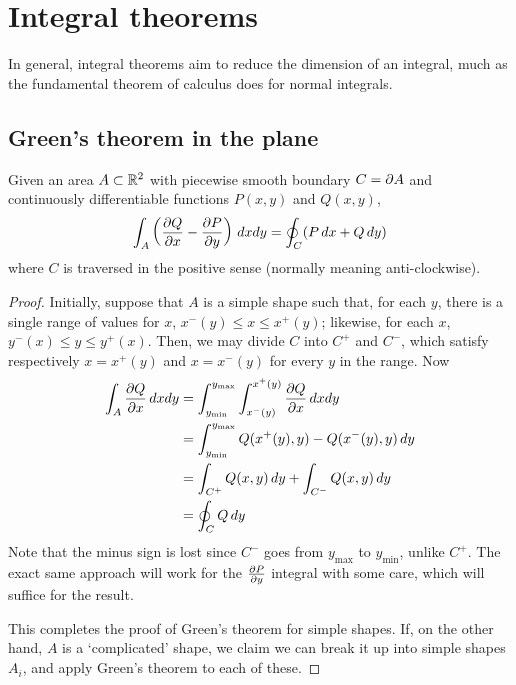 \documentclass{../template/note}
\begin{document}
    \section{Integral theorems}

    In general, integral theorems aim to reduce the dimension of an integral, much as the fundamental theorem of calculus does for normal integrals.

    \subsection{Green's theorem in the plane}

    \begin{theorem}
        \label{6.1}
        Given an area \(A \subset \mathbb R^2\) with piecewise smooth boundary \(C = \partial A\) and continuously differentiable functions \(P(x, y)\) and \(Q(x, y)\),
        \begin{align*}
            \int_A \left(\pd Q x - \pd P y \right) \D x dy = \oint_C (P \D x + Q \, dy)
        \end{align*}
        where \(C\) is traversed in the positive sense (normally meaning anti-clockwise).
    \end{theorem}
    
    \begin{proof}
        Initially, suppose that \(A\) is a simple shape such that, for each \(y\), there is a single range of values for \(x\), \(x^-(y) \leq x \leq x^+(y)\); likewise, for each \(x\), \(y^-(x) \leq y \leq y^+(x)\). Then, we may divide \(C\) into \(C^+\) and \(C^-\), which satisfy respectively \(x = x^+(y)\) and \(x = x^-(y)\) for every \(y\) in the range. Now
        \begin{align*}
            \int_A \pd Q x \D x dy &= \int_{y_\text{min}}^{y_\text{max}} \int_{x^-(y)}^{x^+(y)} \pd Q x \D x dy \\
            &= \int_{y_\text{min}}^{y_\text{max}} Q(x^+(y), y) - Q(x^-(y), y) \D y \\
            &= \int_{C^+} Q(x, y) \D y + \int_{C^-} Q(x, y) \D y \\
            &= \oint_C Q \D y
        \end{align*}
        Note that the minus sign is lost since \(C^-\) goes from \(y_\text{max}\) to \(y_\text{min}\), unlike \(C^+\). The exact same approach will work for the \(\pd P y\) integral with some care, which will suffice for the result.
        
        This completes the proof of Green's theorem for simple shapes. If, on the other hand, \(A\) is a `complicated' shape, we claim we can break it up into simple shapes \(A_i\), and apply Green's theorem to each of these.
    \end{proof}
    
\end{document}
